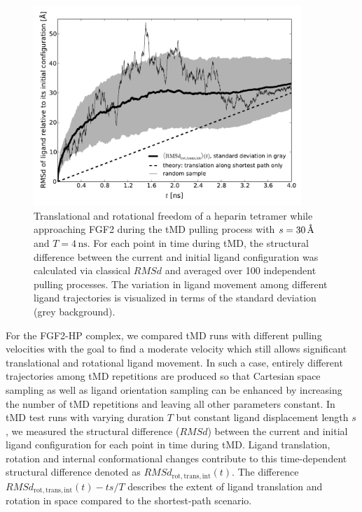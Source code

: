 \begin{figure}
\centering
\includegraphics[width=0.9\textwidth]{gfx/dmd/figure_2_freedom_over_time_100samples_avg_stddev_randomone_pub_003.pdf}
\caption[]{
Translational and rotational freedom of a heparin tetramer
while approaching FGF2 during the tMD pulling process with $s=30\,\textup{\AA}$ and
$T=4\,\mathrm{ns}$. For each point in time during tMD, the structural difference between the
current and initial ligand configuration was calculated via classical $RMSd$ and
averaged over 100 independent pulling processes. The variation in ligand
movement among different ligand trajectories is visualized in terms of the standard
deviation (grey background).
}
\label{fig:dmd:sampling}
\end{figure}



For the FGF2-HP complex, we compared tMD runs with different pulling velocities
with the goal to find a moderate velocity which still allows significant
translational and rotational ligand movement. In such a case, entirely different
trajectories among tMD repetitions are produced so that Cartesian space sampling
as well as ligand orientation sampling can be enhanced by increasing the number
of tMD repetitions and leaving all other parameters constant. In tMD test runs
with varying duration $T$ but constant ligand displacement length $s$, we
measured the structural difference ($RMSd$) between the current and initial
ligand configuration for each point in time during tMD. Ligand translation,
rotation and internal conformational changes contribute to this time-dependent
structural difference denoted as $RMSd_{\mathrm{rot,trans,int}}(t)$.  The
difference $RMSd_{\mathrm{rot,trans,int}}(t) - ts/T$ describes the extent of
ligand translation and rotation in space compared to the shortest-path scenario.

